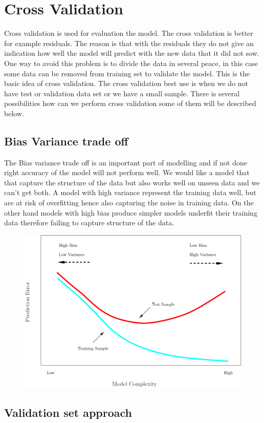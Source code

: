 \chapter{Cross Validation} \label{ch:crossValidation}
Cross validation is used for evaluation the model. The cross validation is better for example residuals. The reason is that with the residuals they do not give an indication how well the model will predict with the new data that it did not sow. One way to avoid this problem is to divide the data in several peace, in this case some data can be removed from training set to validate the model. This is the basic idea of cross validation. The cross validation best use is when we do not have test or validation data set or we have a small sample. There is several possibilities how can we perform cross validation some of them will be described below.

\section {Bias Variance trade off}
The Bias variance trade off is an important part of modelling and if not done right accuracy of the model will not perform well. We would like a model that that capture the structure of the data but also works well on unseen data and we can't get both. A model with high variance represent the training data well, but are at risk of overfitting hence also capturing the noise in training data. On the other hand models with high bias produce simpler models underfit their training data therefore failing to capture structure of the data.

\begin{figure}[h]
	\centering
	\includegraphics[width=0.5\linewidth]{crossValidation/biasVariance}
	\caption{}
	\label{fig:biasvariance}
\end{figure}

\section {Validation set approach}
